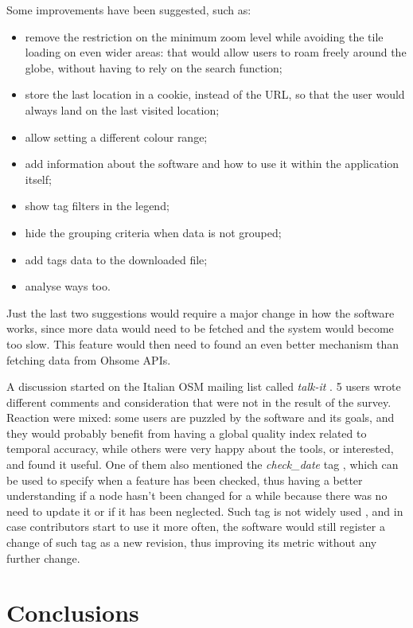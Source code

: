\documentclass{Configuration_Files/PoliMi3i_thesis}
\begin{document}
Some improvements have been suggested, such as:
\begin{itemize}
    \item remove the restriction on the minimum zoom level while avoiding the tile loading on even wider areas: that would allow users to roam freely around the globe, without having to rely on the search function;
    \item store the last location in a cookie, instead of the URL, so that the user would always land on the last visited location;
    \item allow setting a different colour range;
    \item add information about the software and how to use it within the application itself;
    \item show tag filters in the legend;
    \item hide the grouping criteria when data is not grouped;
    \item add tags data to the downloaded file;
    \item analyse ways too.
\end{itemize}

Just the last two suggestions would require a major change in how the software works, since more data would need to be fetched and the system would become too slow. This feature would then need to found an even better mechanism than fetching data from Ohsome APIs.

A discussion started on the Italian OSM mailing list called \textit{talk-it} \cite{frassinelliTalkitOSMUptodate2022}. 5 users wrote different comments and consideration that were not in the result of the survey.
Reaction were mixed: some users are puzzled by the software and its goals, and they would probably benefit from having a global quality index related to temporal accuracy, while others were very happy about the tools, or interested, and found it useful.
One of them also mentioned the \textit{check\_date} tag \cite{KeyCheckDate}, which can be used to specify when a feature has been checked, thus having a better understanding if a node hasn't been changed for a while because there was no need to update it or if it has been neglected. Such tag is not widely used \cite{CheckDateKeys}, and in case contributors start to use it more often, the software would still register a change of such tag as a new revision, thus improving its metric without any further change.

\chapter{Conclusions}
\label{ch:conclusions}
\end{document}
